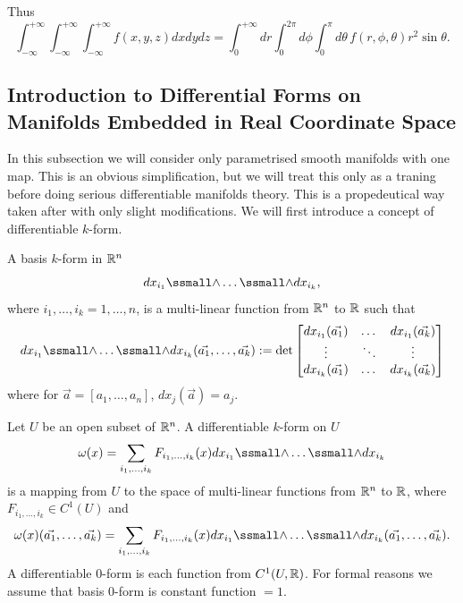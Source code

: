 \documentclass[main.tex]{subfiles}
\begin{document}
Thus
\begin{equation}
\int^{+\infty}_{-\infty} \int^{+\infty}_{-\infty} \int^{+\infty}_{-\infty} f(x, y, z) dxdydz = \int_0^{+\infty} dr \int_0^{2\pi} d\phi \int_0^{\pi} d\theta\, f(r, \phi, \theta) r^2 \sin\theta.
\end{equation}

\subsection{Introduction to Differential Forms on Manifolds Embedded in Real Coordinate Space}
\label{simplified-manifolds}
In this subsection we will consider only parametrised smooth manifolds with one map. This is an obvious simplification, but we will treat this only as a traning before doing serious differentiable manifolds theory. This is a propedeutical way taken after \cite{colley2012} with only slight modifications.
We will first introduce a concept of differentiable $k$-form.
\begin{definition}
A basis $k$-form in $\mathbb{R}^n$
\begin{equation}
dx_{i_1}\form\dots\form dx_{i_k},
\end{equation}
where $i_1, \dots, i_k = 1,\dots, n$,
is a multi-linear function from $\mathbb{R}^n$ to $\mathbb{R}$ such that 
\begin{equation}
dx_{i_1}\form\dots\form dx_{i_k}(\vec{a_1}, \dots, \vec{a_k}) := 
\det\begin{bmatrix}
dx_{i_1}(\vec{a_1}) & \dots & dx_{i_1}(\vec{a_k}) \\
\vdots & \ddots & \vdots \\
dx_{i_k}(\vec{a_1}) & \dots & dx_{i_k}(\vec{a_k})
\end{bmatrix}
\end{equation}
where for $\vec{a} = [a_1, \dots, a_n]$, $dx_j(\vec{a}) = a_j$.
\end{definition}
\begin{definition}
Let $U$ be an open subset of $\mathbb{R}^n$. A differentiable $k$-form on $U$
\begin{equation}
\omega(x) = \sum_{i_1, \dots, i_k} F_{i_1, \dots, i_k}(x) dx_{i_1}\form\dots\form dx_{i_k}
\end{equation}
is a mapping from $U$ to the space of multi-linear functions from $\mathbb{R}^n$ to $\mathbb{R}$, where $F_{i_1, \dots, i_k}\in C^1(U)$ and 
\begin{equation}
\omega(x)(\vec{a_1}, \dots, \vec{a_k}) = \sum_{i_1, \dots, i_k} F_{i_1, \dots, i_k} (x) dx_{i_1}\form\dots\form dx_{i_k}(\vec{a_1}, \dots, \vec{a_k}).
\end{equation}
A differentiable $0$-form is each function from $C^1(U, \mathbb{R})$. For formal reasons we assume that basis $0$-form is constant function $=1$.
\end{definition}
\end{document}
